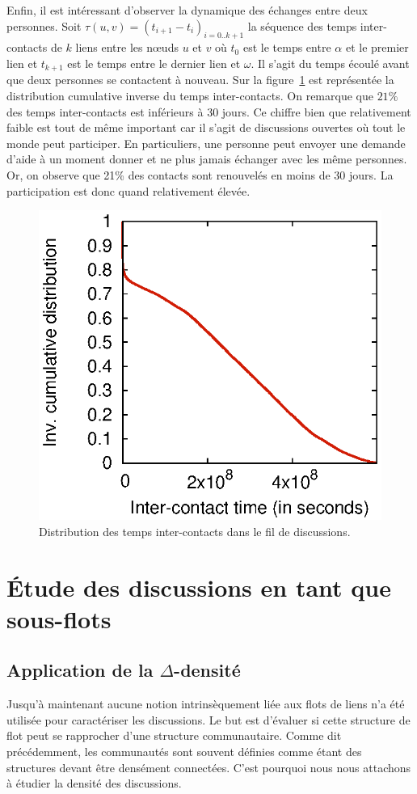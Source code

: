 Enfin, il est intéressant d'observer la dynamique des échanges entre deux personnes.
Soit $\tau(u,v) = (t_{i+1}-t_i)_{i=0..k+1}$ la séquence des temps inter-contacts de $k$ liens entre les n\oe uds $u$ et $v$ où $t_0$ est le temps entre $\alpha$ et le premier lien et $t_{k+1}$ est le temps entre le dernier lien et $\omega$.
Il s'agit du temps écoulé avant que deux personnes se contactent à nouveau.
Sur la figure~\ref{fig:ict_discussion} est représentée la distribution cumulative inverse du temps inter-contacts. 
On remarque que $21\%$ des temps inter-contacts est inférieurs à 30 jours.
Ce chiffre bien que relativement faible est tout de même important car il s'agit de discussions ouvertes où tout le monde peut participer. 
En particuliers, une personne peut envoyer une demande d'aide à un moment donner et ne plus jamais échanger avec les même personnes.
Or, on observe que 21\% des contacts sont renouvelés en moins de 30 jours.
La participation est donc quand relativement élevée.
\begin{figure}
	\centering
	\includegraphics[width=0.49\linewidth]{img/mailing/ict-ccdf.eps}
	\caption{Distribution des temps inter-contacts dans le fil de discussions.}
	\label{fig:ict_discussion}
\end{figure}

\section{\'Etude des discussions en tant que sous-flots}
\label{etude_discussion}
\subsection{Application de la $\Delta$-densité}
\label{delta_densite}

Jusqu'à maintenant aucune notion intrinsèquement liée aux flots de liens n'a été utilisée pour caractériser les discussions.
Le but est d'évaluer si cette structure de flot peut se rapprocher d'une structure communautaire.
Comme dit précédemment, les communautés sont souvent définies comme étant des structures devant être densément connectées.
C'est pourquoi nous nous attachons à étudier la densité des discussions.

